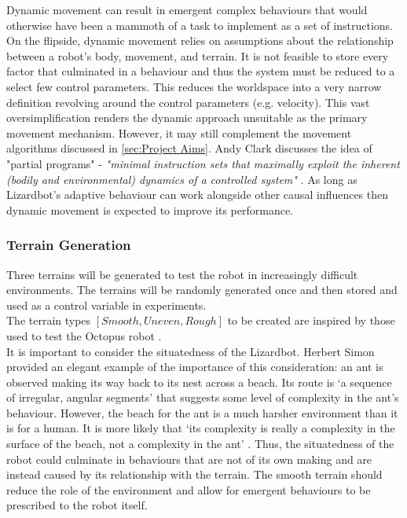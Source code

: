 \documentclass{article}
\begin{document}
Dynamic movement can result in emergent complex behaviours that would otherwise have been a mammoth of a task to implement as a set of instructions. On the flipside, dynamic movement relies on assumptions about the relationship between a robot's body, movement, and terrain. It is not feasible to store every factor that culminated in a behaviour and thus the system must be reduced to a select few control parameters. This reduces the worldspace into a very narrow definition revolving around the control parameters (e.g. velocity). This vast oversimplification renders the dynamic approach unsuitable as the primary movement mechanism. However, it may still complement the movement algorithms discussed in \autoref{sec:Project Aims}. Andy Clark discusses the idea of "partial programs"  - \textit{"minimal instruction sets that maximally exploit the inherent (bodily and environmental) dynamics of a controlled system"} . As long as Lizardbot's adaptive behaviour can work alongside other causal influences then dynamic movement is expected to improve its performance.
 



\newpage
\subsubsection{Terrain Generation}
\label{sec:Terrain Generation}
Three terrains will be generated to test the robot in increasingly difficult environments. The terrains will be randomly generated once and then stored and used as a control variable in experiments.\\ 
The terrain types $[Smooth, Uneven, Rough]$ to be created are inspired by those used to test the Octopus robot .\\

It is important to consider the situatedness of the Lizardbot. Herbert Simon provided an elegant example of the importance of this consideration: an ant is observed making its way back to its nest across a beach.
Its route is ‘a sequence of irregular, angular segments’ that suggests some level of complexity in the ant's behaviour. However, the beach for the ant is a much harsher environment than it is for a human. It is more likely that ‘its complexity is really a complexity in the surface of the beach, not a complexity in the ant’ . Thus, the situatedness of the robot could culminate in behaviours that are not of its own making and are instead caused by its relationship with the terrain. The smooth terrain should reduce the role of the environment and allow for emergent behaviours to be prescribed to the robot itself.\\
\end{document}
